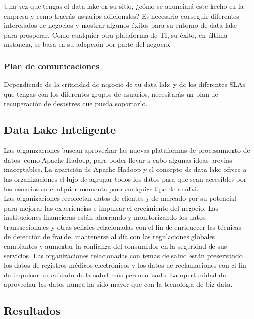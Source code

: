 \documentclass[preprint,12pt]{elsarticle}
\begin{document}
Una vez que tengas el data lake en su sitio, ¿cómo se anunciará este hecho en la empresa y como traerás usuarios adicionales? Es necesario conseguir diferentes interesados de negocios y mostrar algunos éxitos para su entorno de data lake para prosperar. Como cualquier otra plataforma de TI, su éxito, en última instancia, se basa en su adopción por parte del negocio.

\subsubsection{Plan de comunicaciones}

Dependiendo de la criticidad de negocio de tu data lake y de los diferentes SLAs que tengas con los diferentes grupos de usuarios, necesitarás un plan de recuperación de desastres que pueda soportarlo.


\subsection{Data Lake Inteligente}

Las organizaciones buscan aprovechar las nuevas plataformas de procesamiento de datos, como Apache Hadoop, para poder llevar a cabo algunas ideas previas inaceptables. La aparición de Apache Hadoop y el concepto de data lake ofrece a las organizaciones el lujo de agrupar todos los datos para que sean accesibles por los usuarios en cualquier momento para cualquier tipo de análisis.\\

Las organizaciones recolectan datos de clientes y de mercado por su potencial para mejorar las experiencias e impulsar el crecimiento del negocio. Las instituciones financieras están ahorrando y monitorizando los datos transaccionales y otras señales relacionadas con el fin de enriquecer las técnicas de detección de fraude, mantenerse al día con las regulaciones globales cambiantes y aumentar la confianza del consumidor en la seguridad de sus servicios. Las organizaciones relacionadas con temas de salud están preservando los datos de registros médicos electrónicos y los datos de reclamaciones con el fin de impulsar un cuidado de la salud más personalizado. La oportunidad de aprovechar los datos nunca ha sido mayor que con la tecnología de big data.

\subsection{Resultados}
\end{document}
